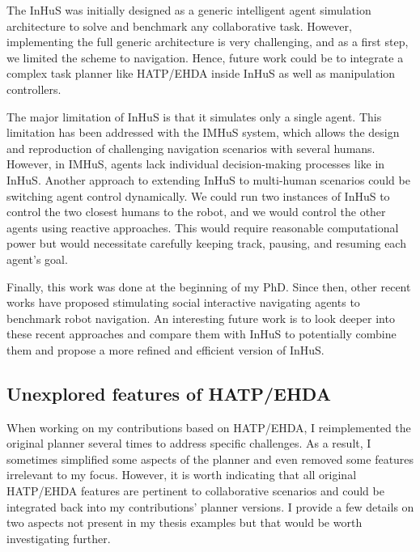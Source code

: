
The InHuS was initially designed as a generic intelligent agent simulation architecture to solve and benchmark any collaborative task. However, implementing the full generic architecture is very challenging, and as a first step, we limited the scheme to navigation. Hence, future work could be to integrate a complex task planner like HATP/EHDA inside InHuS as well as manipulation controllers. 

The major limitation of InHuS is that it simulates only a single agent. This limitation has been addressed with the IMHuS system, which allows the design and reproduction of challenging navigation scenarios with several humans. However, in IMHuS, agents lack individual decision-making processes like in InHuS. Another approach to extending InHuS to multi-human scenarios could be switching agent control dynamically. We could run two instances of InHuS to control the two closest humans to the robot, and we would control the other agents using reactive approaches. This would require reasonable computational power but would necessitate carefully keeping track, pausing, and resuming each agent's goal.

Finally, this work was done at the beginning of my PhD. Since then, other recent works have proposed stimulating social interactive navigating agents to benchmark robot navigation. An interesting future work is to look deeper into these recent approaches and compare them with InHuS to potentially combine them and propose a more refined and efficient version of InHuS. 

\subsection*{Unexplored features of HATP/EHDA}

When working on my contributions based on HATP/EHDA, I reimplemented the original planner several times to address specific challenges. As a result, I sometimes simplified some aspects of the planner and even removed some features irrelevant to my focus. However, it is worth indicating that all original HATP/EHDA features are pertinent to collaborative scenarios and could be integrated back into my contributions' planner versions. I provide a few details on two aspects not present in my thesis examples but that would be worth investigating further.

